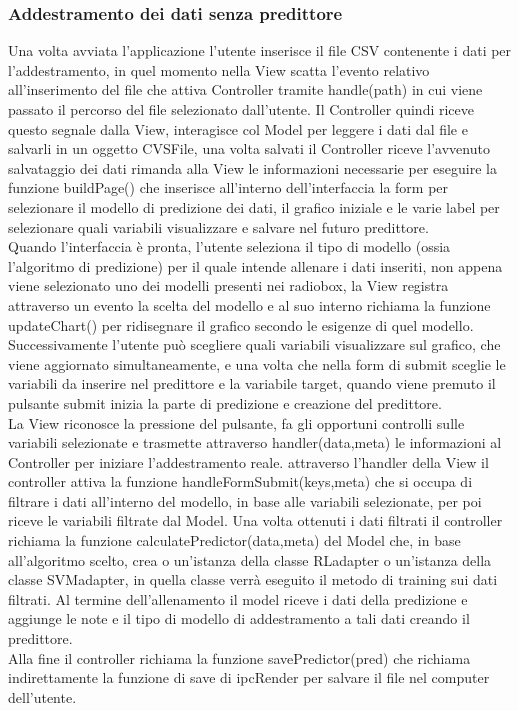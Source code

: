 \documentclass[../manuale-sviluppatore.tex]{subfiles}
\begin{document}
\subsubsection{Addestramento dei dati senza predittore}
\label{ssec:addestramento_dati_senza_predittore}
Una volta avviata l'applicazione l'utente inserisce il file CSV contenente i dati per l'addestramento, in quel momento nella View scatta l'evento relativo all'inserimento del file
che attiva Controller tramite handle(path) in cui viene passato il percorso del file selezionato dall'utente. Il Controller quindi riceve questo segnale dalla View, interagisce col Model
per leggere i dati dal file e salvarli in un oggetto CVSFile, una volta salvati il Controller riceve l'avvenuto salvataggio dei dati rimanda alla View le informazioni necessarie per eseguire 
la funzione buildPage() che inserisce all'interno dell'interfaccia la form per selezionare il modello di predizione dei dati, il grafico iniziale e le varie label per selezionare quali variabili
visualizzare e salvare nel futuro predittore. \\
Quando l'interfaccia è pronta, l'utente seleziona il tipo di modello (ossia l'algoritmo di predizione) per il quale intende allenare i dati inseriti, non appena viene selezionato uno dei modelli
presenti nei radiobox, la View registra attraverso un evento la scelta del modello e al suo interno richiama la funzione updateChart() per ridisegnare il grafico secondo le esigenze di quel modello.
Successivamente l'utente può scegliere quali variabili visualizzare sul grafico, che viene aggiornato simultaneamente, e una volta che nella form di submit sceglie le variabili da inserire nel predittore e la variabile target,
quando viene premuto il pulsante submit inizia la parte di predizione e creazione del predittore. \\
La View riconosce la pressione del pulsante, fa gli opportuni controlli sulle variabili selezionate e trasmette attraverso handler(data,meta) le informazioni al Controller per iniziare l'addestramento reale.
attraverso l'handler della View il controller attiva la funzione handleFormSubmit(keys,meta) che si occupa di filtrare i dati all'interno del modello, in base alle variabili selezionate, per poi riceve le variabili filtrate dal Model.
Una volta ottenuti i dati filtrati il controller richiama la funzione calculatePredictor(data,meta) del Model che, in base all'algoritmo scelto, crea o un'istanza della classe RLadapter o un'istanza della classe SVMadapter, in quella classe verrà eseguito il metodo di training sui dati filtrati.
Al termine dell'allenamento il model riceve i dati della predizione e aggiunge le note e il tipo di modello di addestramento a tali dati creando il predittore. \\
Alla fine il controller richiama la funzione savePredictor(pred) che richiama indirettamente la funzione di save di ipcRender per salvare il file nel computer dell'utente.
\end{document}
